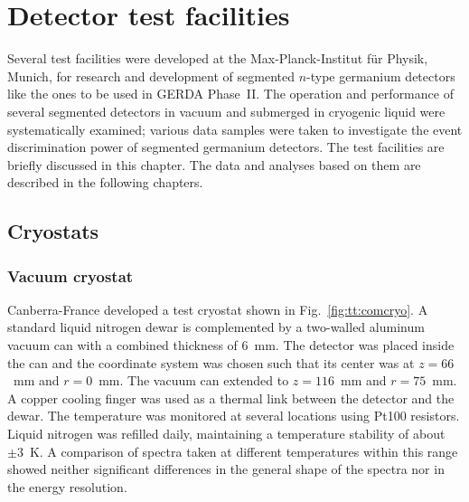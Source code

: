 \chapter{Detector test facilities}
\label{cha:teststand}
Several test facilities were developed at the Max-Planck-Institut
f\"ur Physik, Munich, for research and development of segmented
$n$-type germanium detectors like the ones to be used in GERDA
Phase~II. The operation and performance of several segmented detectors
in vacuum and submerged in cryogenic liquid were systematically
examined; various data samples were taken to investigate the event
discrimination power of segmented germanium detectors. The test
facilities are briefly discussed in this chapter. The data and
analyses based on them are described in the following chapters.

\section{Cryostats}
\label{sec:tt:cryo}

\subsection{Vacuum cryostat}
\label{sec:tt:comc}
Canberra-France developed a test cryostat shown in
Fig.~\ref{fig:tt:comcryo}. A standard liquid nitrogen dewar is
complemented by a two-walled aluminum vacuum can with a combined
thickness of 6~mm. The detector was placed inside the can and the
coordinate system was chosen such that its center was at $z=66$~mm and
$r=0$~mm. The vacuum can extended to $z=116$~mm and $r=75$~mm. A
copper cooling finger was used as a thermal link between the detector
and the dewar. The temperature was monitored at several locations
using Pt100 resistors. Liquid nitrogen was refilled daily, maintaining
a temperature stability of about $\pm3$~K. A comparison of spectra
taken at different temperatures within this range showed neither
significant differences in the general shape of the spectra nor in the
energy resolution.


